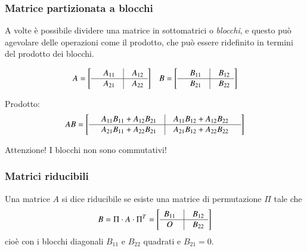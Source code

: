 \subsubsection{Matrice partizionata a blocchi}
A volte \`e possibile dividere una matrice in sottomatrici o
\emph{blocchi}, e questo può agevolare delle operazioni come il
prodotto, che può essere ridefinito in termini del prodotto dei
blocchi.

\begin{example}[4 blocchi]
$$
\begin{array}{ll}
A = \left[
  \begin{array}{ccccc}
    & A_{11} & \vline & A_{12} \\
    \hline 
    & A_{21} & \vline & A_{22} \\
  \end{array}
\right]
&
B = \left[
  \begin{array}{ccccc}
    &  B_{11}& \vline & B_{12} \\
    \hline 
    & B_{21} & \vline & B_{22} \\
  \end{array}
\right]
\end{array}
$$

Prodotto:
$$
AB = \left[
  \begin{array}{ccccc}
    & A_{11}B_{11} + A_{12}B_{21} & \vline & A_{11}B_{12} + A_{12}B_{22} & \\
    \hline 
    & A_{21}B_{11} + A_{22}B_{21} & \vline & A_{21}B_{12} + A_{22}B_{22} &
  \end{array}
\right]
$$
\end{example}

Attenzione! I blocchi non sono commutativi! 


\subsubsection{Matrici riducibili}
\begin{defn}
Una matrice $A$ si dice riducibile se esiste una matrice di
permutazione $\Pi$ tale che
$$
B = \Pi \cdot A \cdot \Pi^{T} =
\left[ 
  \begin{array}{ccc}
    B_{11} & \vline & B_{12} \\ 
    \hline 
    O      & \vline & B_{22}
  \end{array}
\right]
$$
cio\`e con i blocchi diagonali $B_{11}$ e $B_{22}$ quadrati e $B_{21} = 0$.
\end{defn}

